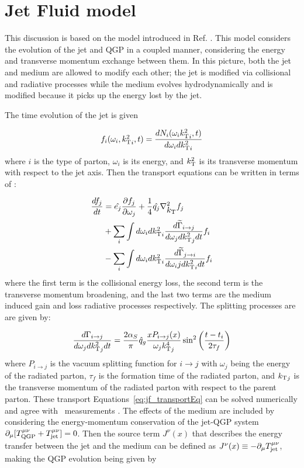 



\section{Jet Fluid model}
This discussion is based on the model introduced in Ref. \cite{Tachibana:2017syd}. This model considers the evolution of the jet and QGP in a coupled manner, considering the energy and transverse momentum exchange between them. In this picture, both the jet and medium are allowed to modify each other; the jet is modified via collisional and radiative processes while the medium evolves hydrodynamically and is modified because it picks up the energy lost by the jet. 

The time evolution of the jet is given 

\begin{align}
f_i (\omega_i, \mbox{$k_{\rm T}^2$}_i, t) = \frac{dN_i (\omega_i \mbox{$k_{\rm T}^2$}_i, t)}{d \omega_i d\mbox{$k_{\rm T}^2$}_i}
\end{align}
where $i$ is the type of parton, $\omega_i$ is its energy, and $\mbox{$k_{\rm T}^2$}$ is its transverse momentum with respect to the jet axis. Then the transport equations can be written in terms of :

\begin{align}
\label{eq:jf_transportEq}
\frac{d f_j}{dt} &= \hat{e_j} \frac{\partial f_j}{\partial \omega_j} + \frac{1}{4} \hat{q_j} \nabla_{\mbox{$k_{\rm T}$}}^2 f_j  \\
& + \sum_i \int d\omega_i d\mbox{$k_{\rm T}^2$}_i \frac{d\widetilde{\Gamma}_{i\rightarrow j} }{d\omega_j d\mbox{$k_{\rm T}^2$}_j dt} f_i \\
& - \sum_i \int d\omega_i d\mbox{$k_{\rm T}^2$}_i \frac{d\widetilde{\Gamma}_{j\rightarrow i} }{d\omega_ij d\mbox{$k_{\rm T}^2$}_i dt} f_i \\
\end{align}
where the first term is the collisional energy loss, the second term is the transverse momentum broadening, and the last two terms are the medium induced gain and loss radiative processes respectively. The splitting processes are are given by:

\begin{align}
\frac{d\Gamma_{i \rightarrow j}}{d \omega_j d\mbox{$k_{\rm T}^2$}_j dt} = \frac{2\alpha_S}{\pi} \hat{q}_g \frac{x P_{i \rightarrow j} (x)}{\omega_j {k_{\rm T}^4}_j} \sin^2 \left(\dfrac{t - t_i}{2\tau_f} \right)
\end{align}
where $P_{i \rightarrow j} $ is the vacuum splitting function for $i \rightarrow j $ with $\omega_j$ being the energy of the radiated parton, $\tau_f$ is the formation time of the radiated parton, and $\mbox{$k_{\rm T}$}_j$ is the transverse momentum of the radiated parton with respect to the parent parton. These transport Equations~\ref{eq:jf_transportEq} can be solved numerically and agree with \RAA\ measurements \cite{Aad:2014bxa, Khachatryan:2016jfl, Abelev:2013kqa}. The effects of the medium are included by considering the energy-momentum conservation of the jet-QGP system $ \partial_\mu [T_{\rm QGP}^{\mu\nu} + T_{\rm jet}^{\mu\nu}] = 0$. Then the source term $J^\nu(x)$ that describes the energy transfer between the jet and the medium can be defined as $J^\nu(x) \equiv -\partial_\mu  T_{\rm jet}^{\mu\nu}$, making the QGP evolution being given by

